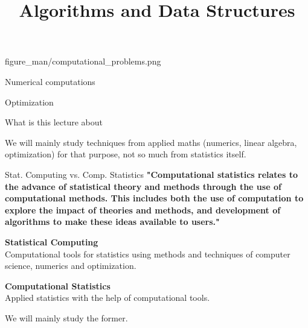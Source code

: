 \documentclass[11pt,compress,t,notes=noshow, xcolor=table]{beamer}
\title{Algorithms and Data Structures}
\begin{document}
{figure_man/computational_problems.png}
{
  \item Numerical computations
  \item Optimization
}

\begin{vbframe}{What is this lecture about}

\lz

We will mainly study techniques from applied maths (numerics, linear algebra, optimization) for that purpose,
not so much from statistics itself.

\end{vbframe}

\begin{vbframe}{Stat. Computing vs. Comp. Statistics}
\textbf{"Computational statistics relates to the advance
  of statistical theory and methods through the use of computational
  methods. This includes both the use of computation to explore the
  impact of theories and methods, and development of algorithms to
  make these ideas available to users."}

\lz
\textbf{Statistical Computing}\\
Computational tools for statistics using methods and techniques of computer science, numerics and optimization.

\bigskip

\textbf{Computational Statistics}\\
Applied statistics with the help of computational tools.

\lz

We will mainly study the former.

\end{vbframe}






\end{document}
